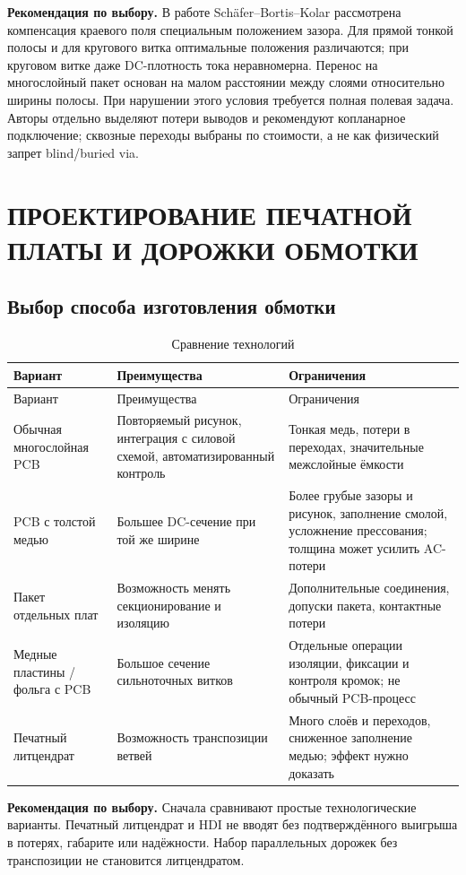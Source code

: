 \documentclass[14pt,a4paper]{extarticle}
\newcommand{\recommend}{\par\noindent\textbf{Рекомендация по выбору.} }
\begin{document}
\recommend В работе Schäfer--Bortis--Kolar рассмотрена компенсация краевого поля специальным положением зазора. Для прямой тонкой полосы и для кругового витка оптимальные положения различаются; при круговом витке даже DC-плотность тока неравномерна. Перенос на многослойный пакет основан на малом расстоянии между слоями относительно ширины полосы. При нарушении этого условия требуется полная полевая задача. Авторы отдельно выделяют потери выводов и рекомендуют копланарное подключение; сквозные переходы выбраны по стоимости, а не как физический запрет blind/buried via.\cite[разделы II--V]{schaefer}

\section{ПРОЕКТИРОВАНИЕ ПЕЧАТНОЙ ПЛАТЫ И ДОРОЖКИ ОБМОТКИ}
\label{pl:pcb}
\subsection{Выбор способа изготовления обмотки}
\begin{longtable}{>{\raggedright\arraybackslash}p{34mm}>{\raggedright\arraybackslash}p{60mm}>{\raggedright\arraybackslash}p{60mm}}
\caption{Сравнение технологий}\label{pl:technologies}\\
\toprule Вариант & Преимущества & Ограничения\\\midrule\endfirsthead
\toprule Вариант & Преимущества & Ограничения\\\midrule\endhead
Обычная многослойная PCB & Повторяемый рисунок, интеграция с силовой схемой, автоматизированный контроль & Тонкая медь, потери в переходах, значительные межслойные ёмкости\\
PCB с толстой медью & Большее DC-сечение при той же ширине & Более грубые зазоры и рисунок, заполнение смолой, усложнение прессования; толщина может усилить AC-потери\\
Пакет отдельных плат & Возможность менять секционирование и изоляцию & Дополнительные соединения, допуски пакета, контактные потери\\
Медные пластины / фольга с PCB & Большое сечение сильноточных витков & Отдельные операции изоляции, фиксации и контроля кромок; не обычный PCB-процесс\\
Печатный литцендрат & Возможность транспозиции ветвей & Много слоёв и переходов, сниженное заполнение медью; эффект нужно доказать\\
\bottomrule
\end{longtable}
\recommend Сначала сравнивают простые технологические варианты. Печатный литцендрат и HDI не вводят без подтверждённого выигрыша в потерях, габарите или надёжности. Набор параллельных дорожек без транспозиции не становится литцендратом.
\end{document}
